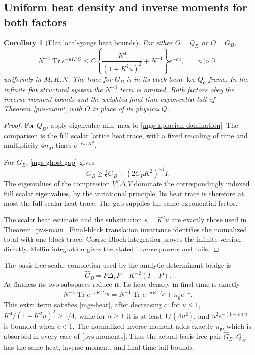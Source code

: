 \documentclass[11pt]{article}
\newtheorem{corollary}[theorem]{Corollary}
\theoremstyle{remark}
\begin{document}
\subsection{Uniform heat density and inverse moments for both factors}
\label{mgs-heat-section}

\begin{corollary}[Flat local-gauge heat bounds]
\label{mgs-heat-corollary}
For either \(O=Q_B\) or \(O=G_B\),
\begin{equation}
 N^{-4}\operatorname{Tr}e^{-uK^2O}
 \le C\left\{\frac{K^4}{(1+K^2u)^2}+N^{-4}\right\}e^{-cu},
 \qquad u>0,
 \label{mgs-heat}
\end{equation}
uniformly in \(M,K,N\).
The trace for \(G_B\) is in its block-local
\(\ker Q_0\) frame.
In the infinite flat structural system the \(N^{-4}\) term is
omitted. Both factors obey the inverse-moment bounds and the
weighted final-time exponential tail of
Theorem~\ref{pvs-main}, with \(O\) in place of its physical \(Q\).
\end{corollary}

\begin{proof}
For \(Q_B\), apply eigenvalue min--max to
\eqref{mgs-laplacian-domination}.
The comparison is the full scalar lattice heat trace, with a
fixed rescaling of time and multiplicity \(4n_{\mathfrak g}\),
times \(e^{-cs/K^2}\).

For \(G_B\), \eqref{mgs-ghost-gap} gives
\[
 G_B\ge\tfrac12G_B+(2C_PK^2)^{-1}I.
\]
The eigenvalues of the compression \(V^T\Delta_sV\)
dominate the correspondingly indexed full scalar eigenvalues,
by the variational principle.
Its heat trace is therefore at most the full scalar heat trace.
The gap supplies the same exponential factor.

The scalar heat estimate and the substitution \(s=K^2u\) are
exactly those used in Theorem~\ref{pvs-main}.
Final-block translation invariance identifies the normalized
total with one block trace.
Coarse Bloch integration proves the infinite version directly.
Mellin integration gives the stated inverse powers and tails.
\end{proof}

The basis-free scalar completion used by the analytic determinant
bridge is
\begin{equation}
 \widehat G_B=P\Delta_sP+K^{-2}(I-P).
 \label{mgs-basis-free-scalar}
\end{equation}
At flatness its two subspaces reduce it. Its heat density in final
time is exactly
\[
 N^{-4}\operatorname{Tr}e^{-uK^2\widehat G_B}
 =N^{-4}\operatorname{Tr}e^{-uK^2G_B}
                        +n_{\mathfrak g}e^{-u}.
\]
This extra term satisfies \eqref{mgs-heat}, after decreasing \(c\):
for \(u\le1\),
\(K^4/(1+K^2u)^2\ge1/4\), while for \(u\ge1\) it is at least
\(1/(4u^2)\), and \(u^2e^{-(1-c)u}\) is bounded when \(c<1\).
The normalized inverse moment adds exactly \(n_{\mathfrak g}\),
which is absorbed in every case of \eqref{pvs-moments}.
Thus the actual basis-free pair \(\widehat G_B,Q_B\) has the
same heat, inverse-moment, and final-time tail bounds.
\end{document}
